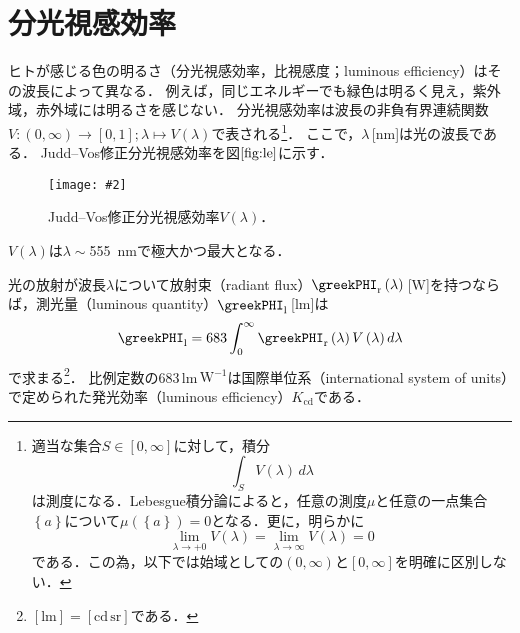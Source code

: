 \documentclass[uplatex,paper=a4,fontsize=4.0truemm,jafontsize=4.0truemm,head_space=30.0truemm,foot_space=30.0truemm,baselineskip=8.0truemm,line_length=40zw,gutter=25.0truemm,oneside,openany,fleqn,hanging_panctuation,open_bracket_pos=nibu_tentsuki,dvipdfmx,jis2004,book,titlepage]{jlreq}
\theoremstyle{mystyle}
\newcommand{\captiondot}[1]{\caption{#1．}}
\newcommand{\figureinput}[4]{\begin{figure}[tbp]\centering\texttt{[image: \#2]}\captiondot{#3}\label{fig:#4}\end{figure}}
\newcommand{\mathdisplaystyle}[1]{\(\displaystyle{#1}\)}
\newcommand{\Reference}[1]{\mathdisplaystyle{\ref{#1}}}
\newcommand{\negativevalue}[1]{{-#1}}
\newcommand{\positivevalue}[1]{{+#1}}
\newcommand{\parentheses}[1]{\left(#1\right)}
\newcommand{\braces}[1]{\left\{#1\right\}}
\newcommand{\squarebrackets}[1]{\left[#1\right]}
\begin{document}
		\section{分光視感効率}
			ヒトが感じる色の明るさ（分光視感効率，比視感度；luminous efficiency）はその波長によって異なる．
			例えば，同じエネルギーでも緑色は明るく見え，紫外域，赤外域には明るさを感じない．
			分光視感効率は波長の非負有界連続関数\mathdisplaystyle{V\colon\parentheses{0,\infty}\to\squarebrackets{0,1};\lambda\mapsto V\parentheses{\lambda}}で表される\footnote{適当な集合\mathdisplaystyle{S\in\squarebrackets{0,\infty}}に対して，積分%
				\begin{equation*}
					\int_S{V\parentheses{\lambda}}\,d\lambda
				\end{equation*}
				は測度になる．Lebesgue積分論によると，任意の測度\mathdisplaystyle{\mu}と任意の一点集合\mathdisplaystyle{\braces{a}}について\mathdisplaystyle{\mu\parentheses{\braces{a}}=0}となる．更に，明らかに%
				\begin{equation*}
					\lim_{\lambda\to\positivevalue{0}}{V\parentheses{\lambda}}=\lim_{\lambda\to\infty}{V\parentheses{\lambda}}=0
				\end{equation*}
				である．この為，以下では始域としての\mathdisplaystyle{\parentheses{0,\infty}}と\mathdisplaystyle{\squarebrackets{0,\infty}}を明確に区別しない．}．
			ここで，\mathdisplaystyle{\lambda}\,[nm]は光の波長である．
			Judd--Vos修正分光視感効率\cite{Vos1978}を図\Reference{fig:le}に示す．
			\figureinput{width=\linewidth}{D:/a/figs/le.png}{Judd--Vos修正分光視感効率\mathdisplaystyle{V\parentheses{\lambda}}}{le}
			\mathdisplaystyle{V\parentheses{\lambda}}は\mathdisplaystyle{\lambda\sim{}}\SI{555}{nm}で極大かつ最大となる．

			光の放射が波長\mathdisplaystyle{\lambda}について放射束（radiant flux）\mathdisplaystyle{\greekPHI_\textrm{r}\parentheses{\lambda}}\,[W]を持つならば，測光量（luminous quantity）\mathdisplaystyle{\greekPHI_\textrm{l}}\,[lm]は
			\begin{equation*}
				\greekPHI_\textrm{l}=683\int_0^\infty{\greekPHI_\textrm{r}\parentheses{\lambda}V\parentheses{\lambda}}\,d\lambda
			\end{equation*}
			で求まる\footnote{\mathdisplaystyle{[\textrm{lm}]=[\textrm{cd}\,\textrm{sr}]}である．}．
			比例定数の683\,lm\,\mathdisplaystyle{\textrm{W}^{\negativevalue{1}}}は国際単位系（international system of units）で定められた発光効率（luminous efficiency）\mathdisplaystyle{K_\textrm{cd}}である．
\end{document}
